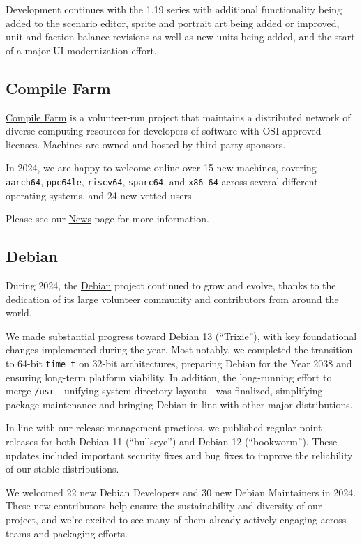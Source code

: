 \documentclass[a4paper]{report}
\begin{document}
Development continues with the 1.19 series with additional functionality being added to the scenario editor, sprite and portrait art being added or improved, unit and faction balance revisions as well as new units being added, and the start of a major UI modernization effort.

\subsection{Compile Farm}

\href{https://portal.cfarm.net/}{Compile Farm} is a volunteer-run project that maintains a distributed network of diverse computing resources for developers of software with OSI-approved licenses. Machines are owned and hosted by third party sponsors.

In 2024, we are happy to welcome online over 15 new machines, covering {\tt aarch64}, {\tt ppc64le}, {\tt riscv64}, {\tt sparc64}, and {\tt x86\_64} across several different operating systems, and 24 new vetted users.

Please see our \href{https://portal.cfarm.net/news/}{News} page for more information.

\subsection{Debian}

During 2024, the \href{https://www.debian.org/}{Debian} project continued to grow and evolve, thanks to the dedication of its large volunteer community and contributors from around the world.

We made substantial progress toward Debian 13 (``Trixie''), with key foundational changes implemented during the year. Most notably, we completed the transition to 64-bit \texttt{time\_t} on 32-bit architectures, preparing Debian for the Year 2038 and ensuring long-term platform viability. In addition, the long-running effort to merge \texttt{/usr}—unifying system directory layouts—was finalized, simplifying package maintenance and bringing Debian in line with other major distributions.

In line with our release management practices, we published regular point releases for both Debian 11 (``bullseye'') and Debian 12 (``bookworm''). These updates included important security fixes and bug fixes to improve the reliability of our stable distributions.

We welcomed 22 new Debian Developers and 30 new Debian Maintainers in 2024. These new contributors help ensure the sustainability and diversity of our project, and we’re excited to see many of them already actively engaging across teams and packaging efforts.
\end{document}
